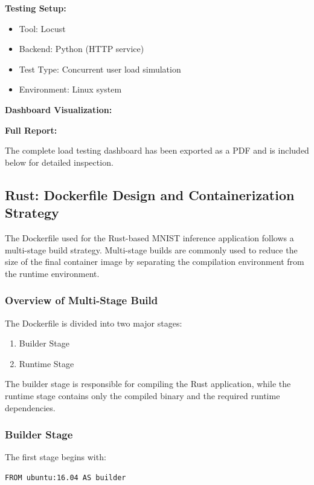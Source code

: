 \documentclass{ieeeaccess}
\begin{document}
\textbf{Testing Setup:}
\begin{itemize}
    \item Tool: Locust
    \item Backend: Python (HTTP service)
    \item Test Type: Concurrent user load simulation
    \item Environment: Linux system
\end{itemize}

\textbf{Dashboard Visualization:}

\textbf{Full Report:}

The complete load testing dashboard has been exported as a PDF and is included below for detailed inspection.




\subsection{Rust: Dockerfile Design and Containerization Strategy}

The Dockerfile used for the Rust-based MNIST inference application follows a multi-stage build strategy. Multi-stage builds are commonly used to reduce the size of the final container image by separating the compilation environment from the runtime environment.

\subsubsection{Overview of Multi-Stage Build}

The Dockerfile is divided into two major stages:

\begin{enumerate}
    \item Builder Stage
    \item Runtime Stage
\end{enumerate}

The builder stage is responsible for compiling the Rust application, while the runtime stage contains only the compiled binary and the required runtime dependencies.

\subsubsection{Builder Stage}

The first stage begins with:

\begin{lstlisting}
FROM ubuntu:16.04 AS builder
\end{lstlisting}
\end{document}
